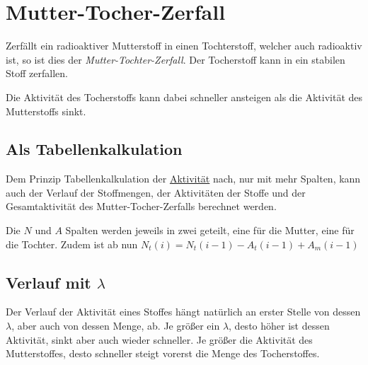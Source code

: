 \documentclass{article}
\begin{document}
\section{Mutter-Tocher-Zerfall}
Zerfällt ein radioaktiver Mutterstoff in einen Tochterstoff, welcher auch radioaktiv ist, so ist dies der \emph{Mutter-Tochter-Zerfall}. Der Tocherstoff kann in ein stabilen Stoff zerfallen.
 
Die Aktivität des Tocherstoffs kann dabei schneller ansteigen als die Aktivität des Mutterstoffs sinkt. 
 
\subsection{Als Tabellenkalkulation}
Dem Prinzip Tabellenkalkulation der \hyperref[Aktivität]{Aktivität} nach, nur mit mehr Spalten, kann auch der Verlauf der Stoffmengen, der Aktivitäten der Stoffe und der Gesamtaktivität des Mutter-Tocher-Zerfalls berechnet werden.
 
Die $N$ und $A$ Spalten werden jeweils in zwei geteilt, eine für die Mutter, eine für die Tochter. Zudem ist ab nun $N_t(i) = N_t(i-1) - A_t(i-1) + A_m(i-1)$
 
\subsection{Verlauf mit $\lambda$} 
Der Verlauf der Aktivität eines Stoffes hängt natürlich an erster Stelle von dessen $\lambda$, aber auch von dessen Menge, ab. Je größer ein $\lambda$, desto höher ist dessen Aktivität, sinkt aber auch wieder schneller. Je größer die Aktivität des Mutterstoffes, desto schneller steigt vorerst die Menge des Tocherstoffes.
\end{document}
